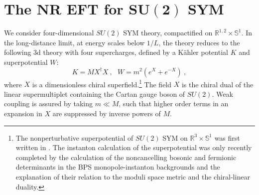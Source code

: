 \documentclass[11pt]{article}
\def\R{{\mathbb R}}
\def\S{{\mathbb S}}
\begin{document}
 
\section{The NR EFT for $\mathbf{SU(2)}$ SYM}
\label{eft1}

We consider four-dimensional $SU(2)$ SYM theory, compactified on $\R^{1,2} \times \S^1$. In the long-distance limit, at energy scales below $1/L$, the theory reduces to 
 the following 3d theory with four supercharges, defined by a K\" ahler potential $K$ and superpotential $W$:
\begin{equation}
\label{eq:L}
K = M X^\dagger X~,~~~ W = m^2 (e^X+ e^{-X})~, 
\end{equation}
where $X$ is a dimensionless chiral 
superfield.\footnote{The nonperturbative superpotential of $SU(2)$ SYM on $\R^3 \times \S^1$ was first written in \cite{Seiberg:1996nz}. The instanton calculation of the superpotential  \cite{Davies:1999uw,Davies:2000nw}    was only recently completed  \cite{Poppitz:2012sw,Anber:2014lba} by the calculation of the  noncancelling  bosonic and fermionic determinants in the BPS monopole-instanton backgrounds and the explanation of their relation to the moduli space metric and the chiral-linear duality.}
The field $X$ is the chiral dual of the linear supermultiplet containing the Cartan gauge boson of $SU(2)$. Weak coupling is assured by taking $m \ll M$, such that higher order terms in an expansion in $X$ are  suppressed by   inverse powers of $M$. 
\end{document}
